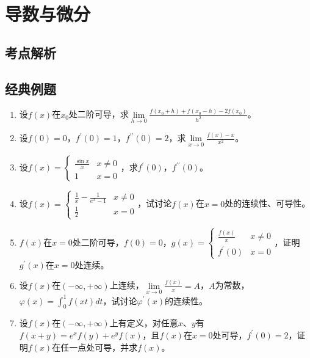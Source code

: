 \chapter{导数与微分}
\section{考点解析} %
\label{sec:考点解析}


\section{经典例题} %
\label{sec:经典例题}

\begin{enumerate}[{例}1.]
    \item 设$f(x)$在$x_0$处二阶可导，求$\lim\limits_{h \to 0}\frac{f(x_0+h)+f(x_0-h)-2f(x_0)}{h^2}$。
    \item 设$f(0)=0$，$f^{\prime}(0)=1$，$f^{\prime\prime}(0)=2$，求$\lim\limits_{x \to 0}\frac{f(x)-x}{x^2}$。
    \item 设$f(x)=\begin{cases}\frac{\sin x}{x} & x \neq 0\\
                               1 & x = 0
                           \end{cases}$，求$f^{\prime}(0)$，$f^{\prime\prime}(0)$。
    \item 设$f(x)=\begin{cases}\frac{1}{x}-\frac{1}{e^x -1} & x \neq 0\\
                                                    \frac{1}{2} & x = 0
                    \end{cases}$，试讨论$f(x)$在$x=0$处的连续性、可导性。
    \item $f(x)$在$x=0$处二阶可导，$f(0)=0$，$g(x)=\begin{cases}\frac{f(x)}{x} & x \neq 0\\
                                                                f^{\prime}(0) & x = 0
                                                            \end{cases}$，证明$g^{\prime}(x)$在$x=0$处连续。
    \item 设$f(x)$在$(-\infty,+\infty)$上连续，$\lim\limits_{x \to 0}\frac{f(x)}{x}=A$，$A$为常数，$\varphi(x)=\int_0^1 f(xt)dt$，试讨论$\varphi^{\prime}(x)$的连续性。
    \item 设$f(x)$在$(-\infty,+\infty)$上有定义，对任意$x$、$y$有$f(x+y)=e^xf(y)+e^yf(x)$，且$f(x)$在$x=0$处可导，$f^{\prime}(0)=2$，证明$f(x)$在任一点处可导，并求$f(x)$。

\end{enumerate}
